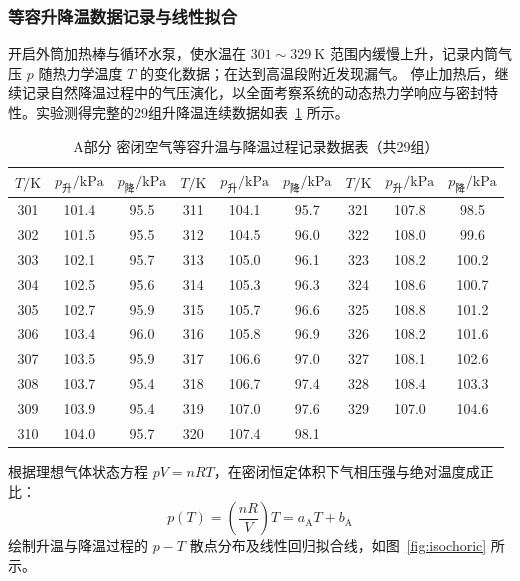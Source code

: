 \documentclass[10pt, a4paper]{ctexart}
\begin{document}
\subsubsection{等容升降温数据记录与线性拟合}
开启外筒加热棒与循环水泵，使水温在 $301\sim 329\ \mathrm{K}$ 范围内缓慢上升，记录内筒气压 $p$ 随热力学温度 $T$ 的变化数据；在达到高温段附近发现漏气。 停止加热后，继续记录自然降温过程中的气压演化，以全面考察系统的动态热力学响应与密封特性。实验测得完整的29组升降温连续数据如表~\ref{tab:part_a} 所示。

\begin{table}[htbp]
\centering
\footnotesize
\setlength{\tabcolsep}{4pt}
\caption{A部分 密闭空气等容升温与降温过程记录数据表（共29组）}
\label{tab:part_a}
\begin{tabular}{ccc|ccc|ccc}
\toprule
$T/\mathrm{K}$ & $p_{\text{升}}/\mathrm{kPa}$ & $p_{\text{降}}/\mathrm{kPa}$ & $T/\mathrm{K}$ & $p_{\text{升}}/\mathrm{kPa}$ & $p_{\text{降}}/\mathrm{kPa}$ & $T/\mathrm{K}$ & $p_{\text{升}}/\mathrm{kPa}$ & $p_{\text{降}}/\mathrm{kPa}$ \\
\midrule
301 & 101.4 & 95.5 & 311 & 104.1 & 95.7 & 321 & 107.8 &  98.5 \\
302 & 101.5 & 95.5 & 312 & 104.5 & 96.0 & 322 & 108.0 &  99.6 \\
303 & 102.1 & 95.7 & 313 & 105.0 & 96.1 & 323 & 108.2 & 100.2 \\
304 & 102.5 & 95.6 & 314 & 105.3 & 96.3 & 324 & 108.6 & 100.7 \\
305 & 102.7 & 95.9 & 315 & 105.7 & 96.6 & 325 & 108.8 & 101.2 \\
306 & 103.4 & 96.0 & 316 & 105.8 & 96.9 & 326 & 108.2 & 101.6 \\
307 & 103.5 & 95.9 & 317 & 106.6 & 97.0 & 327 & 108.1 & 102.6 \\
308 & 103.7 & 95.4 & 318 & 106.7 & 97.4 & 328 & 108.4 & 103.3 \\
309 & 103.9 & 95.4 & 319 & 107.0 & 97.6 & 329 & 107.0 & 104.6 \\
310 & 104.0 & 95.7 & 320 & 107.4 & 98.1 &     &       &       \\
\bottomrule
\end{tabular}
\end{table}

根据理想气体状态方程 $p V = n R T$\cite{ref6, ref8}，在密闭恒定体积下气相压强与绝对温度成正比：
\begin{equation}
p(T) = \left(\frac{nR}{V}\right)T = a_{\mathrm{A}} T + b_{\mathrm{A}}
\label{eq:ideal_gas}
\end{equation}
绘制升温与降温过程的 $p-T$ 散点分布及线性回归拟合线，如图~\ref{fig:isochoric} 所示。
\end{document}
